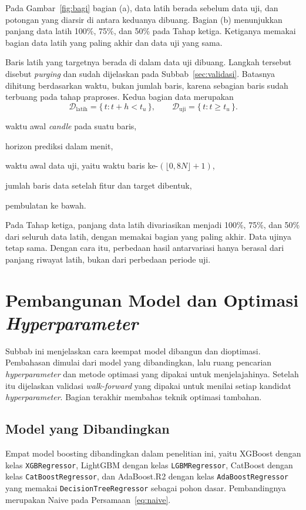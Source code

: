 Pada Gambar~\ref{fig:bagi} bagian (a), data latih berada sebelum data uji, dan
potongan yang diarsir di antara keduanya dibuang. Bagian
(b) menunjukkan panjang data latih 100\%, 75\%, dan 50\% pada Tahap ketiga.
Ketiganya memakai bagian data latih yang paling akhir dan data uji yang sama.

Baris latih yang targetnya berada di dalam data uji dibuang. Langkah
tersebut disebut \textit{purging} dan sudah dijelaskan pada
Subbab~\ref{sec:validasi}. Batasnya dihitung berdasarkan waktu, bukan jumlah
baris, karena sebagian baris sudah terbuang pada tahap praproses. Kedua
bagian data merupakan
\begin{equation}
  \mathcal{D}_{\text{latih}} = \{\, t : t + h < t_u \,\},
  \qquad
  \mathcal{D}_{\text{uji}} = \{\, t : t \ge t_u \,\} .
  \label{eq:split}
\end{equation}
\begin{keterangan}
  \item[$t$] waktu awal \textit{candle} pada suatu baris,
  \item[$h$] horizon prediksi dalam menit,
  \item[$t_u$] waktu awal data uji, yaitu waktu baris
    ke-$(\lfloor 0{,}8N \rfloor + 1)$,
  \item[$N$] jumlah baris data setelah fitur dan target dibentuk,
  \item[$\lfloor \cdot \rfloor$] pembulatan ke bawah.
\end{keterangan}

Pada Tahap ketiga, panjang data latih divariasikan menjadi 100\%, 75\%, dan
50\% dari seluruh data latih, dengan memakai bagian yang paling akhir. Data
ujinya tetap sama. Dengan cara itu, perbedaan hasil antarvariasi
hanya berasal dari panjang riwayat latih, bukan dari perbedaan periode uji.

\section{Pembangunan Model dan Optimasi \textit{Hyperparameter}}
\label{sec:model}
Subbab ini menjelaskan cara keempat model dibangun dan dioptimasi. Pembahasan
dimulai dari model yang dibandingkan, lalu ruang pencarian
\textit{hyperparameter} dan metode optimasi yang dipakai untuk menjelajahinya.
Setelah itu dijelaskan validasi \textit{walk-forward} yang dipakai untuk menilai
setiap kandidat \textit{hyperparameter}. Bagian terakhir membahas teknik
optimasi tambahan.

\subsection{Model yang Dibandingkan}
Empat model boosting dibandingkan dalam penelitian ini, yaitu XGBoost dengan
kelas \texttt{XGBRegressor}, LightGBM dengan kelas \texttt{LGBMRegressor},
CatBoost dengan kelas \texttt{CatBoostRegressor}, dan AdaBoost.R2 dengan kelas
\texttt{AdaBoostRegressor} yang memakai \texttt{DecisionTreeRegressor} sebagai
pohon dasar. Pembandingnya merupakan Naive pada
Persamaan~\eqref{eq:naive}.

